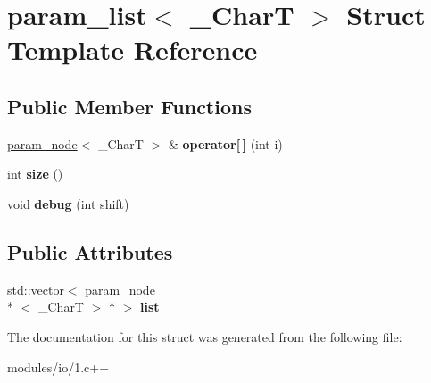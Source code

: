 \hypertarget{structparam__list}{\section{param\-\_\-list$<$ \-\_\-\-Char\-T $>$ Struct Template Reference}
\label{structparam__list}
}
\subsection*{Public Member Functions}
\begin{DoxyCompactItemize}
\item 
\hypertarget{structparam__list_af45b167c103f256deee22fe184099a19}{\hyperlink{structparam__node}{param\-\_\-node}$<$ \-\_\-\-Char\-T $>$ \& {\bfseries operator\mbox{[}$\,$\mbox{]}} (int i)}\label{structparam__list_af45b167c103f256deee22fe184099a19}

\item 
\hypertarget{structparam__list_aeb140db45c879c05966fd12dc1a3333b}{int {\bfseries size} ()}\label{structparam__list_aeb140db45c879c05966fd12dc1a3333b}

\item 
\hypertarget{structparam__list_a4c81a20337b4fe8be36869e89b627def}{void {\bfseries debug} (int shift)}\label{structparam__list_a4c81a20337b4fe8be36869e89b627def}

\end{DoxyCompactItemize}
\subsection*{Public Attributes}
\begin{DoxyCompactItemize}
\item 
\hypertarget{structparam__list_a46ebb75b0bdc6c913d2c984012ad3198}{std\-::vector$<$ \hyperlink{structparam__node}{param\-\_\-node}\\*
$<$ \-\_\-\-Char\-T $>$ $\ast$ $>$ {\bfseries list}}\label{structparam__list_a46ebb75b0bdc6c913d2c984012ad3198}

\end{DoxyCompactItemize}


The documentation for this struct was generated from the following file\-:\begin{DoxyCompactItemize}
\item 
modules/io/1.\-c++\end{DoxyCompactItemize}
